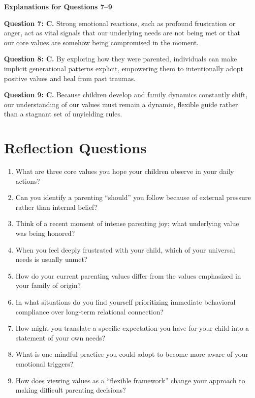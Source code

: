 \begin{practiceexercise}
\newpage
\textbf{Explanations for Questions 7--9}

\textbf{Question 7: C.} Strong emotional reactions, such as profound frustration or anger, act as vital signals that our underlying needs are not being met or that our core values are somehow being compromised in the moment.
\vspace{\fill}

\textbf{Question 8: C.} By exploring how they were parented, individuals can make implicit generational patterns explicit, empowering them to intentionally adopt positive values and heal from past traumas.
\vspace{\fill}

\textbf{Question 9: C.} Because children develop and family dynamics constantly shift, our understanding of our values must remain a dynamic, flexible guide rather than a stagnant set of unyielding rules.
\vspace{\fill}
\end{practiceexercise}

\newpage
\section{Reflection Questions}
\begin{reflection}
\small
\begin{enumerate}[itemsep=0pt, parsep=0pt, topsep=0pt]
  \item What are three core values you hope your children observe in your daily actions?
  \item Can you identify a parenting ``should'' you follow because of external pressure rather than internal belief?
  \item Think of a recent moment of intense parenting joy; what underlying value was being honored?
  \item When you feel deeply frustrated with your child, which of your universal needs is usually unmet?
  \item How do your current parenting values differ from the values emphasized in your family of origin?
  \item In what situations do you find yourself prioritizing immediate behavioral compliance over long-term relational connection?
  \item How might you translate a specific expectation you have for your child into a statement of your own needs?
  \item What is one mindful practice you could adopt to become more aware of your emotional triggers?
  \item How does viewing values as a ``flexible framework'' change your approach to making difficult parenting decisions?
\end{enumerate}
\end{reflection}